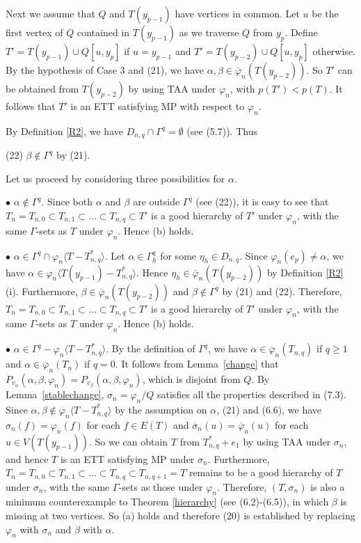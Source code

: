 \documentclass[11pt]{article}
\newcommand{\phibar}{\overline{\varphi}}
\begin{document}
Next we assume that $Q$ and $T(y_{p-1})$ have vertices in common. Let $u$ be the first vertex of $Q$ contained in
$T(y_{p-1})$ as we traverse $Q$ from $y_p$. Define $T'=T(y_{p-1}) \cup Q[u,y_p]$ if $u= y_{p-1}$
and $T'=T(y_{p-2})\cup Q[u,y_p]$ otherwise.  By the hypothesis of Case 3 and (21), we have $\alpha,\beta \in
\phibar_n(T(y_{p-2}))$. So $T'$ can be obtained from $T(y_{p-2})$ by using TAA under $\varphi_n$, with $p(T')<p(T)$. It 
follows that $T'$ is an ETT satisfying MP with respect to $\varphi_n$.

By Definition \ref{R2}, we have $D_{n,q} \cap \Gamma^q=\emptyset$ (see (5.7)). Thus

(22)  $\beta\notin \Gamma^{q}$ by (21).

Let us proceed by considering three possibilities for $\alpha$.
  
$\bullet$ $\alpha\notin \Gamma^{q}$. Since both $\alpha$ and $\beta$ are outside $\Gamma^{q}$ (see (22)),
it is easy to see that $T_n=T_{n,0} \subset T_{n,1} \subset \ldots \subset T_{n,q}\subset T'$ is a good hierarchy of 
$T'$ under $\varphi_n$, with the same $\Gamma$-sets as $T$ under $\varphi_n$. Hence (b) holds.

$\bullet$ $\alpha\in \Gamma^{q}\cap \varphi_n \langle T-T_{n,q}^* \rangle$.  Let $\alpha \in \Gamma^{q}_h$ for some
$\eta_h \in D_{n,q}$. Since $\varphi_n(e_p)\neq\alpha$, we have $\alpha\in \varphi_n \langle T(y_{p-1})-T_{n,q}^* \rangle$. 
Hence  $\eta_h\in \phibar_n(T(y_{p-2}))$ by Definition \ref{R2}(i).  Furthermore, $\beta\in\phibar_n(T(y_{p-2}))$ 
and $\beta\notin\Gamma^q$ by (21) and (22). Therefore, $T_n=T_{n,0} \subset T_{n,1} \subset \ldots \subset T_{n,q}\subset T'$ 
is a good hierarchy of $T'$ under $\varphi_n$, with the same $\Gamma$-sets as $T$ under $\varphi_n$. Hence (b) holds.

$\bullet$ $\alpha \in \Gamma^{q} - \varphi_n \langle T-T_{n,q}^* \rangle$. By the definition of $\Gamma^q$, we have
$\alpha \in \overline{\varphi}_n(T_{n,q})$ if $q \ge 1$ and $\alpha \in \overline{\varphi}_n(T_n)$ if $q=0$. 
It follows from Lemma~\ref{change} that $P_{v_{\alpha}}(\alpha,\beta,\varphi_n)=P_{v_{\beta}}(\alpha,\beta,\varphi_n)$, 
which is disjoint from $Q$. By Lemma~\ref{stablechange}, $\sigma_n=\varphi_n/Q$ satisfies all the properties described 
in (7.3).  Since $\alpha, \beta \notin \varphi_n \langle T-T_{n,q}^* \rangle$ by the assumption on $\alpha$, (21) and (6.6), 
we have $\sigma_n(f)=\varphi_n(f)$ for each $f\in E(T)$ and $\overline{\sigma}_n(u)= \phibar_n(u)$ for each $u\in V(T(y_{p-1}))$.
So we can obtain $T$ from $T_{n,q}^*+e_1$ by using TAA under $\sigma_n$, and hence $T$ is an ETT satisfying MP under $\sigma_n$. 
Furthermore, $T_n=T_{n,0} \subset T_{n,1} \subset \ldots \subset T_{n,q} \subset T_{n,q+1}=T$ remains to be a good hierarchy of $T$ 
under $\sigma_n$, with the same $\Gamma$-sets as those under $\varphi_n$. Therefore, $(T, \sigma_n)$ is also a minimum counterexample to Theorem \ref{hierarchy} (see (6.2)-(6.5)), in which $\beta$ is missing at two vertices. So (a) holds and therefore (20) is established by replacing $\varphi_n$ with $\sigma_n$ and $\beta$ with $\alpha$.
\end{document}
